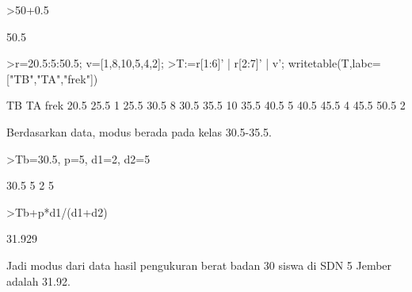\documentclass[a4paper,10pt]{article}
\begin{document}
\begin{eulernotebook}
\begin{eulercomment}
\begin{eulercomment}
\begin{eulercomment}
\begin{eulercomment}
\begin{eulercomment}
\begin{eulercomment}
\begin{eulerprompt}
>50+0.5
\end{eulerprompt}
\begin{euleroutput}
  50.5
\end{euleroutput}
\begin{eulerprompt}
>r=20.5:5:50.5; v=[1,8,10,5,4,2];
>T:=r[1:6]' | r[2:7]' | v'; writetable(T,labc=["TB","TA","frek"])
\end{eulerprompt}
\begin{euleroutput}
          TB        TA      frek
        20.5      25.5         1
        25.5      30.5         8
        30.5      35.5        10
        35.5      40.5         5
        40.5      45.5         4
        45.5      50.5         2
\end{euleroutput}
\begin{eulercomment}
Berdasarkan data, modus berada pada kelas 30.5-35.5.
\end{eulercomment}
\begin{eulerprompt}
>Tb=30.5, p=5, d1=2, d2=5
\end{eulerprompt}
\begin{euleroutput}
  30.5
  5
  2
  5
\end{euleroutput}
\begin{eulerprompt}
>Tb+p*d1/(d1+d2)
\end{eulerprompt}
\begin{euleroutput}
  31.929
\end{euleroutput}
\begin{eulercomment}
Jadi modus dari data hasil pengukuran berat badan 30 siswa di SDN 5
Jember adalah 31.92.


\end{eulercomment}
\end{eulercomment}
\end{eulercomment}
\end{eulercomment}
\end{eulercomment}
\end{eulercomment}
\end{eulercomment}
\end{eulernotebook}
\end{document}
